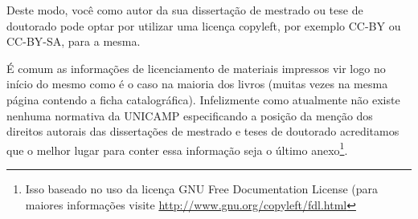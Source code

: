 Deste modo, você como autor da sua dissertação de mestrado ou tese de
doutorado pode optar por utilizar uma licença copyleft, por exemplo CC-BY ou
CC-BY-SA, para a mesma.

É comum as informações de licenciamento de materiais impressos vir logo no
início do mesmo como é o caso na maioria dos livros (muitas vezes na mesma
página contendo a ficha catalográfica). Infelizmente como atualmente não existe
nenhuma normativa da UNICAMP especificando a posição da menção dos direitos
autorais das dissertações de mestrado e teses de doutorado acreditamos que o
melhor lugar para conter essa informação seja o último anexo\footnote{Isso
baseado no uso da licença GNU Free Documentation License (para maiores
informações visite \url{http://www.gnu.org/copyleft/fdl.html}}.
